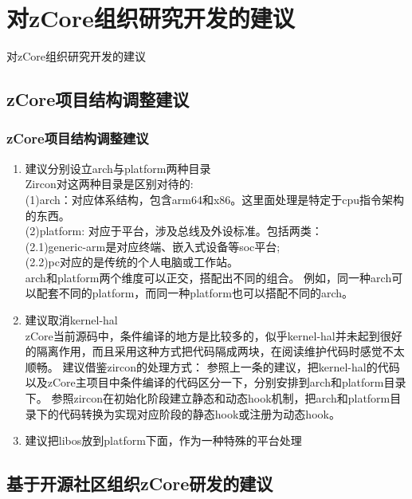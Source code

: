 \documentclass[
8pt, %
]{beamer}
\begin{document}
	\section{对zCore组织研究开发的建议}

	\begin{frame}
		\begin{center}
			{\LARGE 对zCore组织研究开发的建议\\}
		\end{center}
	\end{frame}

	\subsection{zCore项目结构调整建议}

	\begin{frame}
		\frametitle{zCore项目结构调整建议}
		\begin{enumerate}
			\item 建议分别设立arch与platform两种目录\\
			Zircon对这两种目录是区别对待的: \\
			(1)arch：对应体系结构，包含arm64和x86。这里面处理是特定于cpu指令架构的东西。\\
			(2)platform: 对应于平台，涉及总线及外设标准。包括两类：\\
			(2.1)generic-arm是对应终端、嵌入式设备等soc平台;\\
            (2.2)pc对应的是传统的个人电脑或工作站。\\
			arch和platform两个维度可以正交，搭配出不同的组合。
			例如，同一种arch可以配套不同的platform，而同一种platform也可以搭配不同的arch。
			\item 建议取消kernel-hal\\
			zCore当前源码中，条件编译的地方是比较多的，似乎kernel-hal并未起到很好的隔离作用，而且采用这种方式把代码隔成两块，在阅读维护代码时感觉不太顺畅。
			建议借鉴zircon的处理方式：
			参照上一条的建议，把kernel-hal的代码以及zCore主项目中条件编译的代码区分一下，分别安排到arch和platform目录下。
			参照zircon在初始化阶段建立静态和动态hook机制，把arch和platform目录下的代码转换为实现对应阶段的静态hook或注册为动态hook。
			\item 建议把libos放到platform下面，作为一种特殊的平台处理
		\end{enumerate}
	\end{frame}

	\subsection{基于开源社区组织zCore研发的建议}
\end{document}
